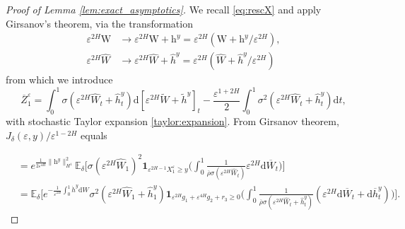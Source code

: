 \documentclass[11pt]{article}
\theoremstyle{plain}
\theoremstyle{definition}
\theoremstyle{remark}
\renewcommand{\bar}{\overline}
\renewcommand{\tilde}{\widetilde}
\renewcommand{\hat}{\widehat}
\newcommand{\dd}{\mathrm{d}}
\newcommand{\bE}{\mathbb{E}}
\newcommand{\1}{\mathbf{1}}
\numberwithin{equation}{section}
\def\eps{\varepsilon}
\def\s{\sigma}
\def\W{\mathrm W}
\def\h{\mathrm h}
\begin{document}
\begin{proof}[Proof of Lemma \ref{lem:exact_asymptotics}]
We recall \eqref{eq:rescX} and apply Girsanov's theorem, via the transformation 
\begin{equation}
\begin{split}
\eps^{2H} \W &\to \eps^{2H} \W + \h^y = \eps^{2H} (\W + \h^y / \eps^{2H}),\\
\eps^{2H} \hat{W} &\to \eps^{2H} \hat{W} + \hat{h}^y = \eps^{2H} (\hat{W} + \hat{h}^y / \eps^{2H})
\end{split}
\end{equation}
from which we introduce
\begin{equation}\label{def:Z}
\bar{Z}_1^\eps=\int_0^1\s \left( \eps^{2H} \hat W_t+\hat h_t^y\right)
\dd [ \eps^{2H} \tilde W + \tilde h^y ]_t
-\frac{\eps^{1+2H}}{2} \int_0^1\sigma ^{2}\left( \eps^{2H}
\hat W_t+\hat h_t^y\right) \dd t,
\end{equation}
with stochastic Taylor expansion \eqref{taylor:expansion}.
From Girsanov theorem, $J_\delta(\eps,y) / \eps^{1-2H}$ equals
{  
\[
\begin{split}
&=
 e^{ \frac{1}{2\eps^{4H}} \| \h^y \|^2_{H^1 }}
\bE_\delta \bigg[\sigma(\eps^{2H}\hat{W}_1)^2 
\1_{\eps^{2H-1} X_1^\eps \geq y } \big( \int_0^1\frac{1}{\bar{\rho} \sigma(\eps^{2H} \hat{W}_t) } {\eps^{2H}}  
\dd \bar{W}_t\big) \bigg]
\\
&=
\bE_\delta \bigg[ e^{-\frac{1}{\eps^{2H}} \int_0^1 \dot{h}^y \dd W }
\sigma^2 (\eps^{2H} \hat{W}_1+\hat{h}_1^y) 
\1_{\eps^{2H} g_1  + \eps^{4H} g_2   + r_3 \geq 0}  \big( \int_0^1\frac{1}{\bar{\rho} \sigma(\eps^{2H} \hat{W}_t+\hat{h}_t^y) }(  {\eps^{2H}}  
\dd \bar{W}_t + \dd \bar{h}_t^y)\big)
\bigg].
\end{split}
\]

}
\end{proof}
\end{document}
